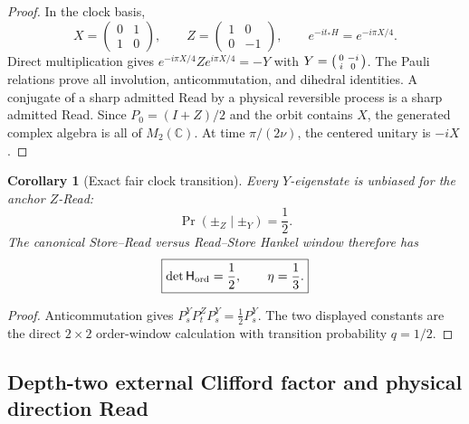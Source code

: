 \documentclass[11pt]{article}
\newtheorem{corollary}[theorem]{Corollary}
\theoremstyle{definition}
\theoremstyle{remark}
\newcommand{\C}{\mathbb C}
\begin{document}
\begin{proof}
In the clock basis,
\[
 X=\begin{pmatrix}0&1\\1&0\end{pmatrix},
 \qquad
 Z=\begin{pmatrix}1&0\\0&-1\end{pmatrix},
 \qquad
 e^{-it_*H}=e^{-i\pi X/4}.
\]
Direct multiplication gives
$e^{-i\pi X/4}Ze^{i\pi X/4}=-Y$ with
$Y=\begin{psmallmatrix}0&-i\\i&0\end{psmallmatrix}$.
The Pauli relations prove all involution, anticommutation, and dihedral
identities.  A conjugate of a sharp admitted Read by a physical reversible
process is a sharp admitted Read.  Since $P_0=(I+Z)/2$ and the orbit contains
$X$, the generated complex algebra is all of $M_2(\C)$.  At time
$\pi/(2\nu)$, the centered unitary is $-iX$.
\end{proof}

\begin{corollary}[Exact fair clock transition]
\label{cor:fair-clock-transition-master}
Every $Y$-eigenstate is unbiased for the anchor $Z$-Read:
\[
 \Pr(\pm_Z\mid\pm_Y)=\frac12.
\]
The canonical Store--Read versus Read--Store Hankel window therefore has
\[
 \boxed{\det\mathsf H_{\rm ord}=\frac12,
 \qquad \eta=\frac13.}
\]
\end{corollary}

\begin{proof}
Anticommutation gives
$P^Y_sP^Z_tP^Y_s=\frac12P^Y_s$.  The two displayed constants are the direct
$2\times2$ order-window calculation with transition probability $q=1/2$.
\end{proof}

\subsection{Depth-two external Clifford factor and physical direction Read}
\end{document}

